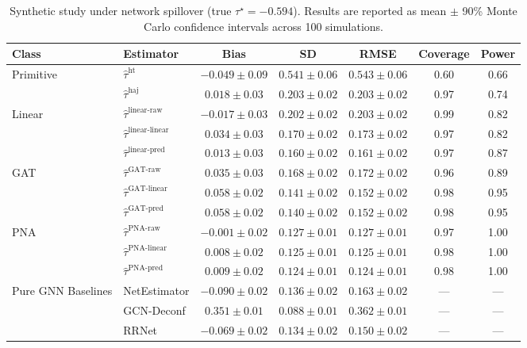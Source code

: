 \documentclass[twoside]{article}
\theoremstyle{plain}
\theoremstyle{definition}
\theoremstyle{remark}
\begin{document}
\begin{table}[t]
\centering
\caption{Synthetic study under network spillover (true $\tau^\star = -0.594$). Results are reported as mean $\pm$ 90\% Monte Carlo confidence intervals across 100 simulations.}
\footnotesize
\begin{tabular}{ll|ccc|cc}
\toprule
Class & Estimator & Bias & SD & RMSE & Coverage & Power \\
\midrule
\multirow{2}{*}{Primitive}
& $\hat{\tau}^{\text{ht}}$
& $-0.049 \pm 0.09$ & $0.541 \pm 0.06$ & $0.543 \pm 0.06$ & 0.60 & 0.66 \\
& $\hat{\tau}^{\text{haj}}$
& $0.018 \pm 0.03$ & $0.203 \pm 0.02$ & $0.203 \pm 0.02$ & 0.97 & 0.74 \\
\midrule
\multirow{3}{*}{Linear}
& $\hat{\tau}^{\text{linear-raw}}$
& $-0.017 \pm 0.03$ & $0.202 \pm 0.02$ & $0.203 \pm 0.02$ & 0.99 & 0.82 \\
& $\hat{\tau}^{\text{linear-linear}}$
& $0.034 \pm 0.03$ & $0.170 \pm 0.02$ & $0.173 \pm 0.02$ & 0.97 & 0.82 \\
& $\hat{\tau}^{\text{linear-pred}}$
& $0.013 \pm 0.03$ & $0.160 \pm 0.02$ & $0.161 \pm 0.02$ & 0.97 & 0.87 \\
\midrule
\multirow{3}{*}{GAT}
& $\hat{\tau}^{\text{GAT-raw}}$
& $0.035 \pm 0.03$ & $0.168 \pm 0.02$ & $0.172 \pm 0.02$ & 0.96 & 0.89 \\
& $\hat{\tau}^{\text{GAT-linear}}$
& $0.058 \pm 0.02$ & $0.141 \pm 0.02$ & $0.152 \pm 0.02$ & 0.98 & 0.95 \\
& $\hat{\tau}^{\text{GAT-pred}}$
& $0.058 \pm 0.02$ & $0.140 \pm 0.02$ & $0.152 \pm 0.02$ & 0.98 & 0.95 \\
\midrule
\multirow{3}{*}{PNA}
& $\hat{\tau}^{\text{PNA-raw}}$
& $\mathbf{-0.001 \pm 0.02}$ & $\mathbf{0.127 \pm 0.01}$ & $\mathbf{0.127 \pm 0.01}$ & 0.97 & 1.00 \\
& $\hat{\tau}^{\text{PNA-linear}}$
& $\mathbf{0.008 \pm 0.02}$ & $\mathbf{0.125 \pm 0.01}$ & $\mathbf{0.125 \pm 0.01}$ & 0.98 & 1.00 \\
& $\hat{\tau}^{\text{PNA-pred}}$
& $\mathbf{0.009 \pm 0.02}$ & $\mathbf{0.124 \pm 0.01}$ & $\mathbf{0.124 \pm 0.01}$ & 0.98 & 1.00 \\
\midrule
\multirow{3}{*}{Pure GNN Baselines}
& NetEstimator
& $-0.090 \pm 0.02$ & $0.136 \pm 0.02$ & $0.163 \pm 0.02$ & --- & --- \\
& GCN-Deconf
& $0.351 \pm 0.01$ & $0.088 \pm 0.01$ & $0.362 \pm 0.01$ & --- & --- \\
& RRNet
& $-0.069 \pm 0.02$ & $0.134 \pm 0.02$ & $0.150 \pm 0.02$ & --- & --- \\
\bottomrule
\end{tabular}
\label{tab:synthetic_full}
\end{table}
\end{document}
